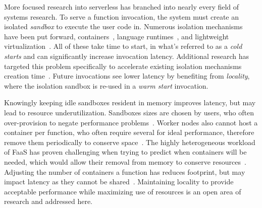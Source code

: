 More focused research into serverless has branched into nearly every field of systems research.
To serve a function invocation, the system must create an isolated \emph{sandbox} to execute the user code in.
Numerous isolation mechanisms have been put forward, containers~\cite{chhatrapati2021towards,docker-main,gvisor}, language runtimes~\cite{shillaker2020faasm,aytekin2019harnessing}, and lightweight virtualization~\cite{firecracker-nsdi20}.
All of these take time to start, in what's referred to as a \textit{cold starts} and can significantly increase invocation latency.
Additional research has targeted this problem specifically to accelerate existing isolation mechanisms creation time~\cite{mohan2019agile,du2020catalyzer,warm2}.
Future invocations see lower latency by benefiting from \emph{locality}, where the isolation sandbox is re-used in a \textit{warm start} invocation.

Knowingly keeping idle sandboxes resident in memory improves latency, but may lead to resource underutilization.
Sandboxes sizes are chosen by users, who often over-provision to negate performance problems~\cite{mvondo2021ofc,romero2021faa,eismann2021sizeless,yu2021harvesting,serverless-harvest-sosp21}.
Worker nodes also cannot host a container per function, who often require several for ideal performance, therefore remove them periodically to conserve space~\cite{faascache-asplos21}.
The highly heterogeneous workload of FaaS has proven challenging when trying to predict when containers will be needed, which would allow their removal from memory to conserve resources~\cite{shahrad2020serverless,zhao2021understanding}.
Adjusting the number of containers a function has reduces footprint, but may impact latency as they cannot be shared~\cite{enes2020real,li2022kneescale}.
Maintaining locality to provide acceptable performance while maximizing use of resources is an open area of research and addressed here.


